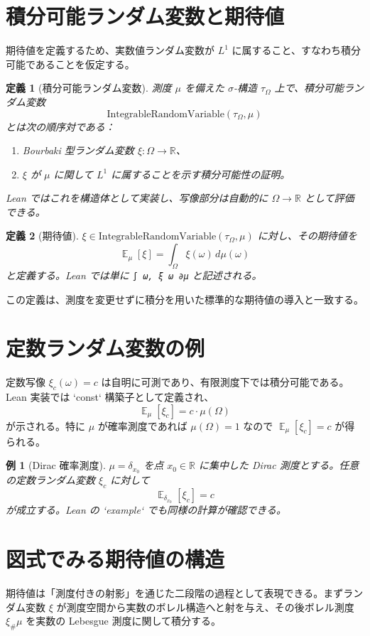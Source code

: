 \documentclass[a4paper]{ltjsarticle}
\newtheorem{definition}{定義}
\newtheorem{example}{例}
\DeclareMathOperator{\E}{\mathbb{E}}
\begin{document}
\section{積分可能ランダム変数と期待値}
期待値を定義するため、実数値ランダム変数が $L^1$ に属すること、すなわち積分可能であることを仮定する。
\begin{definition}[積分可能ランダム変数]
測度 $\mu$ を備えた $\sigma$-構造 $\tau_\Omega$ 上で、\emph{積分可能ランダム変数}
\[
\mathrm{IntegrableRandomVariable}(\tau_\Omega, \mu)
\]
とは次の順序対である：
\begin{enumerate}
  \item Bourbaki 型ランダム変数 $\xi \colon \Omega \to \mathbb{R}$、
  \item $\xi$ が $\mu$ に関して $L^1$ に属することを示す積分可能性の証明。
\end{enumerate}
Lean ではこれを構造体として実装し、写像部分は自動的に $\Omega \to \mathbb{R}$ として評価できる。
\end{definition}

\begin{definition}[期待値]
$\xi \in \mathrm{IntegrableRandomVariable}(\tau_\Omega, \mu)$ に対し、その期待値を
\[
\E_{\mu}[\xi] = \int_{\Omega} \xi(\omega)\,d\mu(\omega)
\]
と定義する。Lean では単に \verb|∫ ω, ξ ω ∂μ| と記述される。
\end{definition}

この定義は、測度を変更せずに積分を用いた標準的な期待値の導入と一致する。

\section{定数ランダム変数の例}
定数写像 $\xi_c(\omega) = c$ は自明に可測であり、有限測度下では積分可能である。Lean 実装では `const` 構築子として定義され、
\[
\E_{\mu}[\xi_c] = c \cdot \mu(\Omega)
\]
が示される。特に $\mu$ が確率測度であれば $\mu(\Omega) = 1$ なので $\E_{\mu}[\xi_c] = c$ が得られる。

\begin{example}[Dirac 確率測度]
$\mu = \delta_{x_0}$ を点 $x_0 \in \mathbb{R}$ に集中した Dirac 測度とする。任意の定数ランダム変数 $\xi_c$ に対して
\[
\E_{\delta_{x_0}}[\xi_c] = c
\]
が成立する。Lean の `example` でも同様の計算が確認できる。
\end{example}

\section{図式でみる期待値の構造}
期待値は「測度付きの射影」を通じた二段階の過程として表現できる。まずランダム変数 $\xi$ が測度空間から実数のボレル構造へと射を与え、その後ボレル測度 $\xi_{\#}\mu$ を実数の Lebesgue 測度に関して積分する。
\end{document}
